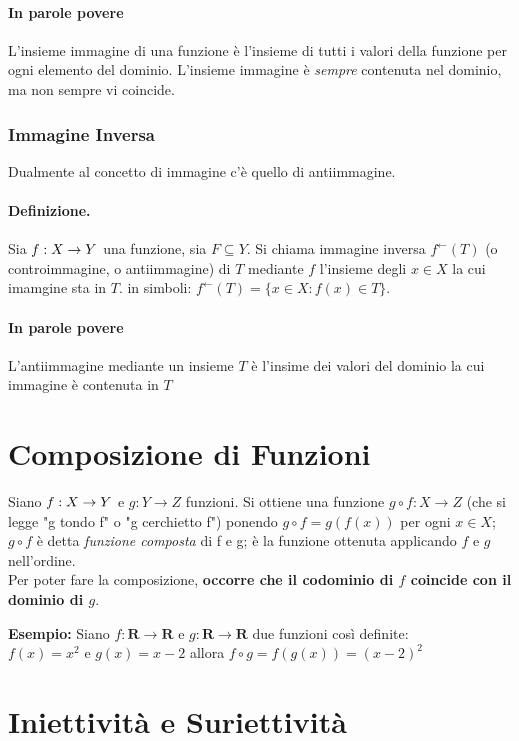 \documentclass[12pt, a4paper, openany]{book}
\newcommand{\esempio}[1]{\begin{box_esempio} \textbf{Esempio: }#1\end{box_esempio}}
\begin{document}
\paragraph{In parole povere} L'insieme immagine di una funzione è l'insieme di tutti i valori della funzione per ogni elemento del dominio.
L'insieme immagine è \emph{sempre} contenuta nel dominio, ma non sempre vi coincide.

\subsubsection{Immagine Inversa}
Dualmente al concetto di immagine c'è quello di antiimmagine.
\paragraph{Definizione. }Sia $f: X \rightarrow Y $ una funzione, sia $F \subseteq Y$.
Si chiama immagine inversa $f^\leftarrow(T)$ (o controimmagine, o antiimmagine) di $T$ mediante $f$ l'insieme degli $x \in X$ la cui imamgine sta in $T$.
in simboli: $f^\leftarrow(T) = \{ x \in X : f(x) \in T\}$.
\paragraph{In parole povere} L'antiimmagine mediante un insieme $T$ è l'insime dei valori del dominio la cui immagine è contenuta in $T$


\section{Composizione di Funzioni} 
Siano $f: X \rightarrow Y$ e $g: Y \rightarrow Z$ funzioni.
Si ottiene una funzione $g \circ f : X \rightarrow Z $ (che si legge "g tondo f" o "g cerchietto f") ponendo $g \circ f = g(f(x))$ per ogni $x \in X$;
$g \circ f$ è detta \emph{funzione composta} di f e g; è la funzione ottenuta applicando $f$ e $g$ nell'ordine.
\\Per poter fare la composizione, \textbf{occorre che il codominio di $f$ coincide con il dominio di $g$}.


\esempio{
    Siano $f: \mathbf{R} \rightarrow \mathbf{R}$ e $g: \mathbf{R} \rightarrow \mathbf{R}$ due funzioni così definite:
    \\ $f(x) = x^2$ e $g(x) = x - 2$ allora $f \circ g = f(g(x)) = (x-2)^2$    
}
\section{Iniettività e Suriettività}
\end{document}
